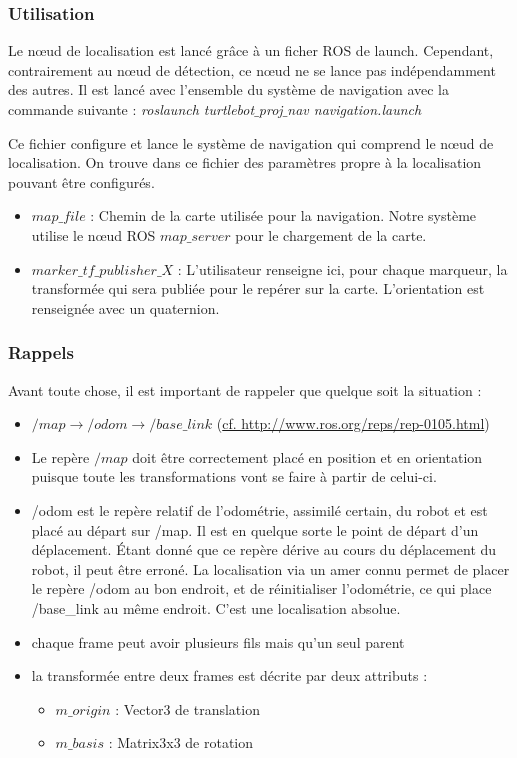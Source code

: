 \documentclass[10pt,a4paper]{article}
\begin{document}
\subsubsection{Utilisation}
Le nœud de localisation est lancé gr\^ace à un ficher ROS de launch. Cependant, contrairement au nœud de détection, ce nœud ne se lance pas indépendamment des autres. Il est lancé avec l'ensemble du système de navigation avec la commande suivante : \textit{roslaunch turtlebot$\_$proj$\_$nav navigation.launch}

Ce fichier configure et lance le système de navigation qui comprend le nœud de localisation. On trouve dans ce fichier des paramètres propre à la localisation pouvant être configurés.

\begin{itemize}
\item $map\_file$ : Chemin de la carte utilisée pour la navigation. Notre système utilise le nœud ROS $map\_server$ pour le chargement de la carte.
\item $marker\_tf\_publisher\_X$ : L'utilisateur renseigne ici, pour chaque marqueur, la transformée qui sera publiée pour le repérer sur la carte. L'orientation est renseignée avec un quaternion. 
\end{itemize}

\subsubsection{Rappels}
Avant toute chose, il est important de rappeler que quelque soit la situation :
\begin{itemize}
\item $/map \rightarrow /odom \rightarrow /base\_link $ (\url{cf. http://www.ros.org/reps/rep-0105.html})
\item Le repère $/map$ doit être correctement placé en position et en orientation puisque toute les transformations vont se faire à partir de celui-ci.
\item /odom est le repère relatif de l'odométrie, assimilé certain, du robot et est placé au départ sur /map. Il est en quelque sorte le point de départ d'un déplacement. Étant donné que ce repère dérive au cours du déplacement du robot, il peut être erroné. La localisation via un amer connu permet de placer le repère /odom au bon endroit, et de réinitialiser l'odométrie, ce qui place /base\_link au même endroit. C'est une localisation absolue.
\item chaque frame peut avoir plusieurs fils mais qu'un seul parent
\item la transformée entre deux frames est décrite par deux attributs : 
  \begin{itemize}
  \item $m\_origin$ : Vector3 de translation 
  \item $m\_basis$ : Matrix3x3 de rotation
  \end{itemize}
\end{itemize}
\end{document}
